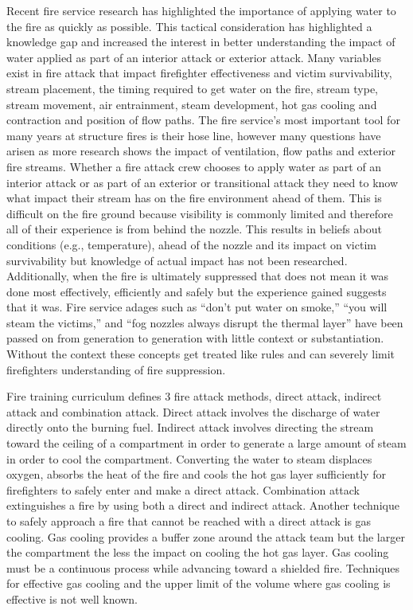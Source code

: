 \documentclass[12pt,oneside]{book}
\begin{document}
Recent fire service research has highlighted the importance of applying water to the fire as quickly as possible. This tactical consideration has highlighted a knowledge gap and increased the interest in better understanding the impact of water applied as part of an interior attack or exterior attack. Many variables exist in fire attack that impact firefighter effectiveness and victim survivability, stream placement, the timing required to get water on the fire, stream type, stream movement, air entrainment, steam development, hot gas cooling and contraction and position of flow paths. The fire service's most important tool for many years at structure fires is their hose line, however many questions have arisen as more research shows the impact of ventilation, flow paths and exterior fire streams. Whether a fire attack crew chooses to apply water as part of an interior attack or as part of an exterior or transitional attack they need to know what impact their stream has on the fire environment ahead of them. This is difficult on the fire ground because visibility is commonly limited and therefore all of their experience is from behind the nozzle. This results in beliefs about conditions (e.g., temperature), ahead of the nozzle and its impact on victim survivability but knowledge of actual impact has not been researched. Additionally, when the fire is ultimately suppressed that does not mean it was done most effectively, efficiently and safely but the experience gained suggests that it was. Fire service adages such as ``don’t put water on smoke,'' ``you will steam the victims,'' and ``fog nozzles always disrupt the thermal layer'' have been passed on from generation to generation with little context or substantiation. Without the context these concepts get treated like rules and can severely limit firefighters understanding of fire suppression.

Fire training curriculum defines 3 fire attack methods, direct attack, indirect attack and combination attack. Direct attack involves the discharge of water directly onto the burning fuel. Indirect attack involves directing the stream toward the ceiling of a compartment in order to generate a large amount of steam in order to cool the compartment. Converting the water to steam displaces oxygen, absorbs the heat of the fire and cools the hot gas layer sufficiently for firefighters to safely enter and make a direct attack. Combination attack extinguishes a fire by using both a direct and indirect attack. Another technique to safely approach a fire that cannot be reached with a direct attack is gas cooling. Gas cooling provides a buffer zone around the attack team but the larger the compartment the less the impact on cooling the hot gas layer. Gas cooling must be a continuous process while advancing toward a shielded fire. Techniques for effective gas cooling and the upper limit of the volume where gas cooling is effective is not well known.  
\end{document}
